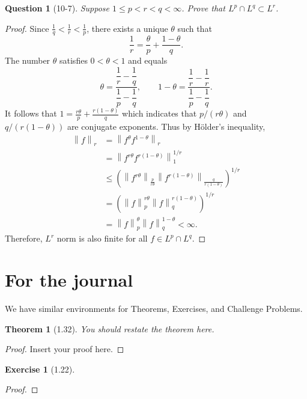 \documentclass[11pt]{article}
\theoremstyle{quest}
\newtheorem*{theorem}{Theorem}
\newtheorem*{question}{Question}
\newtheorem*{exercise}{Exercise}
\begin{document}
\begin{question}[10-7]
  Suppose $1 \leq p < r < q < \infty$. Prove that $L^{p} \cap L^{q} \subset L^{r}$.
\end{question}
\begin{proof}
  Since $\frac{1}{q} < \frac{1}{r} < \frac{1}{p}$, there exists a unique $\theta$ such that
  $$
    \frac{1}{r} = \frac{\theta}{p} + \frac{1-\theta}{q}.
  $$
  The number $\theta$ satisfies $0 < \theta < 1$ and equals
  $$
    \theta = \dfrac{\dfrac{1}{r} - \dfrac{1}{q}}{\dfrac{1}{p}-\dfrac{1}{q}}, \qquad 1-\theta = \dfrac{\dfrac{1}{r}-\dfrac{1}{r}}{\dfrac{1}{p}-\dfrac{1}{q}}.
  $$
  It follows that $1 = \frac{r\theta}{p}+\frac{r\left(1-\theta\right)}{q}$ which indicates that $p/\left(r\theta\right)$ and $q/\left(r\left(1-\theta\right)\right)$ are conjugate exponents. Thus by Hölder's inequality,
  \begin{align}
    \left\|f\right\|_{r} &= \left\|f^{\theta}f^{1-\theta}\right\|_{r}\\
    &=\left\|f^{r\theta}f^{r\left(1-\theta\right)}\right\|_{1}^{1/r}\\
    &\leq \left(\left\|f^{r\theta}\right\|_{\frac{p}{r\theta}}\left\|f^{r\left(1-\theta\right)}\right\|_{\frac{q}{r\left(1-\theta\right)}}\right)^{1/r}\\
    &= \left(\left\|f\right\|_{p}^{r\theta}\left\|f\right\|_{q}^{r\left(1-\theta\right)}\right)^{1/r}\\
    &=\left\|f\right\|_{p}^{\theta}\left\|f\right\|_{q}^{1-\theta} < \infty.
  \end{align}
Therefore, $L^{r}$ norm is also finite for all $f \in L^{p}\cap L^{q}$.
\end{proof}

\section*{For the journal}

We have similar environments for Theorems, Exercises, and Challenge Problems.

\begin{theorem}[1.32]
  You should restate the theorem here.
\end{theorem}
\begin{proof}
  Insert your proof here.
\end{proof}


\begin{exercise}[1.22]

\end{exercise}
\begin{proof}

\end{proof}
\end{document}
